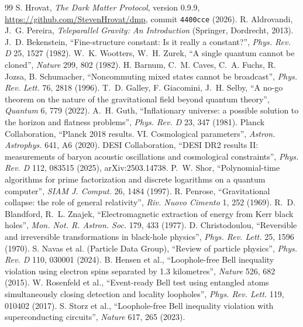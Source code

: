 \documentclass[11pt,a4paper]{article}
\theoremstyle{definition}
\begin{document}
\begin{thebibliography}{99}\small
{} S. Hrovat, \emph{The Dark Matter Protocol}, version 0.9.9, \url{https://github.com/StevenHrovat/dmp}, commit
\texttt{4400cce} (2026).
 R. Aldrovandi, J.~G. Pereira, \emph{Teleparallel Gravity: An Introduction} (Springer, Dordrecht, 2013).
 J.~D. Bekenstein, ``Fine-structure constant: Is it really a constant?'', \emph{Phys. Rev. D} 25, 1527 (1982).
 W.~K. Wootters, W.~H. Zurek, ``A single quantum cannot be cloned'', \emph{Nature} 299, 802 (1982).
 H. Barnum, C.~M. Caves, C.~A. Fuchs, R. Jozsa, B. Schumacher, ``Noncommuting mixed states cannot be broadcast'',
\emph{Phys. Rev. Lett.} 76, 2818 (1996).
 T.~D. Galley, F. Giacomini, J.~H. Selby, ``A no-go theorem on the nature of the gravitational field beyond quantum
theory'', \emph{Quantum} 6, 779 (2022).
 A.~H. Guth, ``Inflationary universe: a possible solution to the horizon and flatness problems'', \emph{Phys. Rev. D} 23, 347
(1981).
 Planck Collaboration, ``Planck 2018 results. VI. Cosmological parameters'', \emph{Astron. Astrophys.} 641, A6 (2020).
 DESI Collaboration, ``DESI DR2 results II: measurements of baryon acoustic oscillations and cosmological constraints'',
\emph{Phys. Rev. D} 112, 083515 (2025), arXiv:2503.14738.
 P.~W. Shor, ``Polynomial-time algorithms for prime factorization and discrete logarithms on a quantum computer'',
\emph{SIAM J. Comput.} 26, 1484 (1997).
 R. Penrose, ``Gravitational collapse: the role of general relativity'', \emph{Riv. Nuovo Cimento} 1, 252 (1969).
 R.~D. Blandford, R.~L. Znajek, ``Electromagnetic extraction of energy from Kerr black holes'', \emph{Mon. Not. R. Astron.
Soc.} 179, 433 (1977).
 D. Christodoulou, ``Reversible and irreversible transformations in black-hole physics'', \emph{Phys. Rev. Lett.}
25, 1596 (1970).
 S. Navas et al. (Particle Data Group), ``Review of particle physics'', \emph{Phys. Rev. D} 110, 030001 (2024).
 B. Hensen et al., ``Loophole-free Bell inequality violation using electron spins separated by 1.3 kilometres'',
\emph{Nature} 526, 682 (2015).
 W. Rosenfeld et al., ``Event-ready Bell test using entangled atoms simultaneously closing detection and locality
loopholes'', \emph{Phys. Rev. Lett.} 119, 010402 (2017).
 S. Storz et al., ``Loophole-free Bell inequality violation with superconducting circuits'', \emph{Nature} 617, 265 (2023).

\end{thebibliography}
\end{document}
